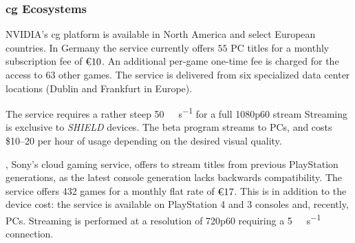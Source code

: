 


\subsubsection{\Gls{cg} Ecosystems}

NVIDIA's \gls{cg} platform%
\gfnow
is available in North America and select European countries.
In Germany the service currently offers $55$ PC titles
for a monthly subscription fee of $\text{\texteuro} 10$. An additional
per-game one-time fee
is charged for the access to $63$ other games.
The service is delivered from six
specialized data center locations (Dublin and Frankfurt in Europe).

The service requires a rather steep
\SI{50}{\mega\bit\per\second} for a full
1080p60 stream%
Streaming is exclusive to \textit{SHIELD} devices.
The \gfnowpc beta program streams to \glspl{PC}, and costs
\$\SIrange{10}{20}{} per hour of usage depending on the desired
visual quality.


\psnow, Sony's cloud gaming service, offers to stream titles from previous
PlayStation generations, as the latest console generation lacks
backwards compatibility.
The service offers 432 games for a monthly flat rate of
$\text{\texteuro}17$.
This is in addition to
the device cost: the service is available on PlayStation 4 and 3
consoles and, recently, \glspl{PC}.
Streaming is performed at a resolution of
720p60 requiring a \SI{5}{\mega\bit\per\second}
connection.


